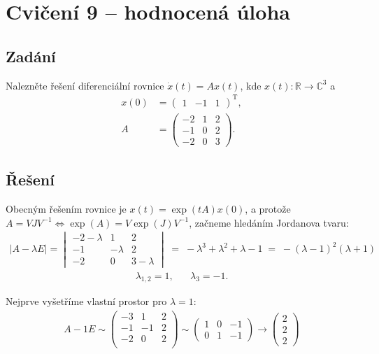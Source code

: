 \documentclass[]{article}
\begin{document}
\pagebreak

\section{Cvičení 9 – hodnocená úloha}
\subsection{Zadání}
Nalezněte řešení diferenciální rovnice $\dot{x}(t) = A x(t)$, kde $x(t): \mathbb{R} \rightarrow \mathbb{C}^3$ a
\begin{align*}
    x(0) &=
    \begin{pmatrix}
        1 & -1 & 1
    \end{pmatrix}^\mathrm{T},
    \\
    A &=
    \begin{pmatrix}
        -2 & 1 & 2 \\
        -1 & 0 & 2 \\
        -2 & 0 & 3
    \end{pmatrix}.
\end{align*}

\subsection{Řešení}
Obecným řešením rovnice je $x(t) = \exp(tA) x(0)$, a protože $A = VJV^{-1} \iff \exp(A) = V \exp(J) V^{-1}$, začneme hledáním Jordanova tvaru:
\begin{align*}
    | A - \lambda E |
    = \begin{vmatrix}
        -2-\lambda & 1 & 2 \\
        -1 & -\lambda & 2 \\
        -2 & 0 & 3-\lambda
    \end{vmatrix}
    \;=\; -\lambda^3 + \lambda^2 + \lambda - 1
    \;=\; -(\lambda - 1)^2 (\lambda + 1)
\end{align*}
\begin{align*}
    \lambda_{1,2} = 1, \;\;\;\;\;\; \lambda_3 = -1.
\end{align*}

\medskip
\medskip

Nejprve vyšetříme vlastní prostor pro $\lambda=1$:
\begin{align*}
    A - 1E
    \sim
    \begin{pmatrix}
        -3 & 1 & 2 \\
        -1 &-1 & 2 \\
        -2 & 0 & 2 \\
    \end{pmatrix}
    \sim
    \begin{pmatrix}
        1 & 0 & -1 \\
        0 & 1 & -1
    \end{pmatrix}
    \rightarrow
    \begin{pmatrix}
        2 \\ 2 \\ 2
    \end{pmatrix}
\end{align*}
\end{document}
